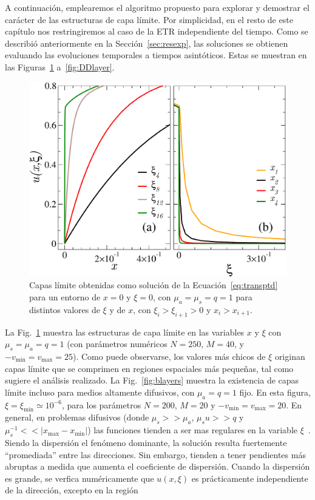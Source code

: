 A continuación, emplearemos el algoritmo propuesto para 
explorar y demostrar el carácter de las estructuras de capa límite. 
Por simplicidad, en el resto de este capítulo nos restringiremos 
al caso de la ETR independiente del tiempo. 
Como se describió anteriormente 
en la Sección~\ref{sec:resexp}, las soluciones se obtienen 
evaluando las evoluciones temporales a tiempos asintóticos.
Estas se muestran en las Figuras~\ref{fig:blayers1} 
a~\ref{fig:DDlayer}.
\begin{figure}[h!]
\centering
  \includegraphics[width=0.5\linewidth]{figuras/xilay.pdf}
  \caption{Capas límite obtenidas como solución 
  de la Ecuación~\eqref{eq:transptd} para un entorno de $x=0$ y $\xi=0$, 
  con $\mu_a=\mu_s=q=1$ para distintos valores de $\xi$ y de $x$, 
  con $\xi_i>\xi_{i+1}>0$ y $x_i>x_{i+1}$.}
 \label{fig:blayers1}
\end{figure}
La Fig.~\ref{fig:blayers1} muestra las estructuras de capa límite en las 
variables $x$ y $\xi$ con $\mu_s=\mu_a=q=1$ (con parámetros numéricos $N=250$, $M=40$, 
y $-v_{\text{min}}=v_{\text{max}}=25$). Como puede observarse, 
los valores más chicos de $\xi$ 
originan capas límite que se comprimen en regiones espaciales más 
pequeñas, tal como sugiere el análisis realizado. 
La Fig.~\ref{fig:blayers} muestra la existencia de 
capas límite incluso para medios altamente difusivos, con 
$\mu_a=q=1$ fijo. En esta figura, 
$\xi=\xi_{\text{min}}\simeq 10^{-6}$, para los parámetros 
$N=200$, $M=20$ y $-v_{\text{min}}=v_{\text{max}}=20$. 
En general, en problemas difusivos 
(donde $\mu_s>>\mu_a$, $\mu_su>>q$ y $\mu_s^{-1}<<|x_{\text{max}}-x_{\text{min}}|$) 
las funciones tienden a ser mas regulares en la variable $\xi$~\cite{Larsen1987}. 
Siendo la dispersión el fenómeno dominante, 
la solución resulta fuertemente ``promediada'' entre las direcciones.  
Sin embargo, tienden a tener pendientes más abruptas 
a medida que aumenta el coeficiente de dispersión. Cuando la dispersión es grande, 
se verfica numéricamente que 
 $u(x,\xi)$ es prácticamente independiente de la dirección, excepto en la región 

